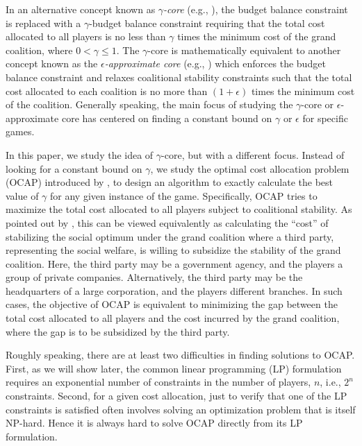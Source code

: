 \documentclass[ijoc,nonblindrev]{informs3} %
\begin{document}
In an alternative concept known as {\em $\gamma$-core} (e.g., \citealt{Jain2007CostSharing}), the budget balance constraint is replaced with a $\gamma$-budget balance constraint requiring that the total cost allocated to all players is no less than ${\gamma}$ times the minimum cost of the grand coalition, where $0<\gamma\leq 1$. The  $\gamma$-core is mathematically equivalent to another concept known as the {\em $\epsilon$-approximate core} (e.g., \citealt{Faigle1998EuclideanTSPGamesCore,Blaser2008MetricTSPGamesCore}) which enforces the budget balance constraint and relaxes coalitional stability constraints such that the total cost allocated to each coalition is no more than $(1+\epsilon)$ times the minimum cost of the coalition.  Generally speaking, the main focus of studying the $\gamma$-core or $\epsilon$-approximate core has centered on finding a constant bound on $\gamma$ or $\epsilon$ for specific games.

In this paper, we study the idea of $\gamma$-core, but with a different focus. Instead of looking for a constant bound on $\gamma$, we study the optimal cost allocation problem (OCAP) introduced by \cite{Caprara2010LPB}, to design an algorithm to exactly calculate the best value of $\gamma$ for any given instance of the game.
Specifically, OCAP tries to maximize the total cost allocated to all players subject to coalitional stability.
As pointed out by \cite{Caprara2010LPB}, this can be viewed equivalently as calculating the ``cost'' of stabilizing the social optimum under the grand coalition where a third party, representing the social welfare, is willing to subsidize the stability of the grand coalition.  
Here, the third party may be a government agency, and the players a group of private companies. Alternatively, the third party may be the headquarters of a large corporation, and the players different branches. In such cases, the objective of OCAP is equivalent to minimizing the gap between the total cost allocated to all players and the cost incurred by the grand coalition, where the gap is to be subsidized by the third party.

Roughly speaking, there are at least two difficulties in finding solutions to OCAP. First, as we will show later, the common linear programming (LP) formulation requires an exponential number of constraints in the number of players, $n$, i.e., $2^n$ constraints.  Second, for a given cost allocation, just to verify that one of the LP constraints is satisfied often involves solving an optimization problem that is itself NP-hard. Hence it is always hard to solve OCAP directly from its LP formulation. 
\end{document}
